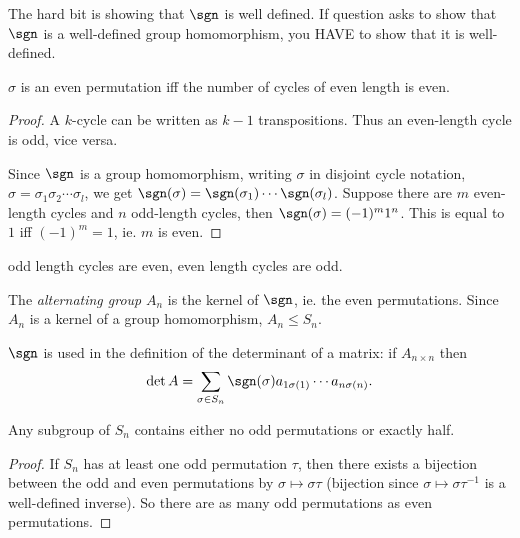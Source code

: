 \documentclass[a4paper]{article}
\begin{document}
  \note The hard bit is showing that $\sgn$ is well defined. If question asks to show that $\sgn$ is a well-defined group homomorphism, you HAVE to show that it is well-defined.

  \begin{lemma}
    $\sigma$ is an even permutation iff the number of cycles of even length is even.
  \end{lemma}

  \begin{proof}
    A $k$-cycle can be written as $k - 1$ transpositions. Thus an even-length cycle is odd, vice versa.

    Since $\sgn$ is a group homomorphism, writing $\sigma$ in disjoint cycle notation, $\sigma = \sigma_1\sigma_2\cdots\sigma_l$, we get $\sgn(\sigma) = \sgn(\sigma_1)\cdots \sgn(\sigma_l)$. Suppose there are $m$ even-length cycles and $n$ odd-length cycles, then $\sgn(\sigma) = (-1)^m 1^n$. This is equal to $1$ iff $(-1)^m = 1$, ie. $m$ is even. 
  \end{proof}
  \note odd length cycles are even, even length cycles are odd.

  \begin{defi}
    The \emph{alternating group} $A_n$ is the kernel of $\sgn$, ie. the even permutations.
    Since $A_n$ is a kernel of a group homomorphism, $A_n \leq S_n$.
  \end{defi}
  \note $\sgn$ is used in the definition of the determinant of a matrix: if $A_{n\times n}$ then
  \[
    \det A = \sum_{\sigma\in S_n}\sgn(\sigma) a_{1\sigma(1)}\cdots a_{n\sigma(n)}.
  \]

  \begin{prop}
    Any subgroup of $S_n$ contains either no odd permutations or exactly half.
  \end{prop}

  \begin{proof}
    If $S_n$ has at least one odd permutation $\tau$, then there exists a bijection between the odd and even permutations by $\sigma \mapsto \sigma\tau$ (bijection since $\sigma \mapsto \sigma \tau^{-1}$ is a well-defined inverse). So there are as many odd permutations as even permutations. 
  \end{proof}
\end{document}
